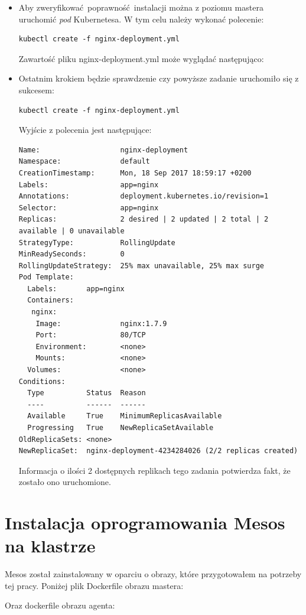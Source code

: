 \documentclass[10pt,a4paper,titlepage,twoside]{report}
\begin{document}
\begin{itemize}
\item Aby zweryfikować poprawność instalacji można z poziomu mastera uruchomić \textit{pod} Kubernetesa. W tym celu należy wykonać polecenie:
\begin{lstlisting}[breaklines=true]
kubectl create -f nginx-deployment.yml
\end{lstlisting}
Zawartość pliku nginx-deployment.yml może wyglądać następująco:

\item Ostatnim krokiem będzie sprawdzenie czy powyższe zadanie uruchomiło się z sukcesem:
\begin{lstlisting}[breaklines=true]
kubectl create -f nginx-deployment.yml
\end{lstlisting}
Wyjście z polecenia jest następujące:
\begin{lstlisting}[breaklines=true]
Name:                   nginx-deployment
Namespace:              default
CreationTimestamp:      Mon, 18 Sep 2017 18:59:17 +0200
Labels:                 app=nginx
Annotations:            deployment.kubernetes.io/revision=1
Selector:               app=nginx
Replicas:               2 desired | 2 updated | 2 total | 2 available | 0 unavailable
StrategyType:           RollingUpdate
MinReadySeconds:        0
RollingUpdateStrategy:  25% max unavailable, 25% max surge
Pod Template:
  Labels:       app=nginx
  Containers:
   nginx:
    Image:              nginx:1.7.9
    Port:               80/TCP
    Environment:        <none>
    Mounts:             <none>
  Volumes:              <none>
Conditions:
  Type          Status  Reason
  ----          ------  ------
  Available     True    MinimumReplicasAvailable
  Progressing   True    NewReplicaSetAvailable
OldReplicaSets: <none>
NewReplicaSet:  nginx-deployment-4234284026 (2/2 replicas created)
\end{lstlisting}
Informacja o ilości 2 dostępnych replikach tego zadania potwierdza fakt, że zostało ono uruchomione.
\end{itemize}

\section{Instalacja oprogramowania Mesos na klastrze}
Mesos został zainstalowany w oparciu o obrazy, które przygotowałem na potrzeby tej pracy.
Poniżej plik Dockerfile obrazu mastera:

Oraz dockerfile obrazu agenta:

\end{document}
